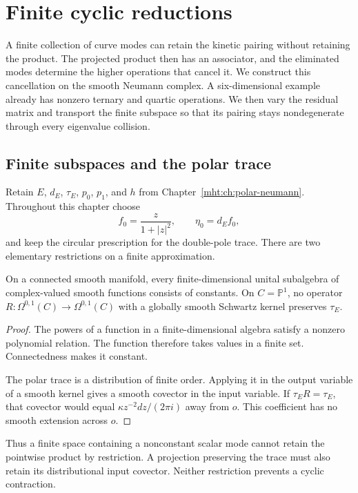 \chapter{Finite cyclic reductions}
\label{mht:ch:finite-reductions}

A finite collection of curve modes can retain the kinetic pairing
without retaining the product. The projected product then has an
associator, and the eliminated modes determine the higher operations
that cancel it. We construct this cancellation on the smooth Neumann
complex. A six-dimensional example already has nonzero ternary and
quartic operations. We then vary the residual matrix and transport the
finite subspace so that its pairing stays nondegenerate through every
eigenvalue collision.

\section{Finite subspaces and the polar trace}

Retain $E$, $d_E$, $\tau_E$, $p_0$, $p_1$, and $h$ from
Chapter~\ref{mht:ch:polar-neumann}. Throughout this chapter choose
\[
 f_0=\frac{z}{1+|z|^2},\qquad \eta_0=d_Ef_0,
\]
and keep the circular prescription for the double-pole trace.
There are two elementary restrictions on a finite approximation.

\begin{proposition}\label{mht:prop:finite-restrictions}
On a connected smooth manifold, every finite-dimensional unital
subalgebra of complex-valued smooth functions consists of constants.
On $C=\mathbb P^1$, no operator
$R:\Omega^{0,1}(C)\to\Omega^{0,1}(C)$ with a globally smooth
Schwartz kernel preserves $\tau_E$.
\end{proposition}

\begin{proof}
The powers of a function in a finite-dimensional algebra satisfy a
nonzero polynomial relation. The function therefore takes values in
a finite set. Connectedness makes it constant.

The polar trace is a distribution of finite order. Applying it in
the output variable of a smooth kernel gives a smooth covector in
the input variable. If $\tau_ER=\tau_E$, that covector would equal
$\kappa z^{-2}dz/(2\pi i)$ away from $o$. This coefficient has no
smooth extension across $o$.
\end{proof}

Thus a finite space containing a nonconstant scalar mode cannot
retain the pointwise product by restriction. A projection preserving
the trace must also retain its distributional input covector. Neither
restriction prevents a cyclic contraction.


